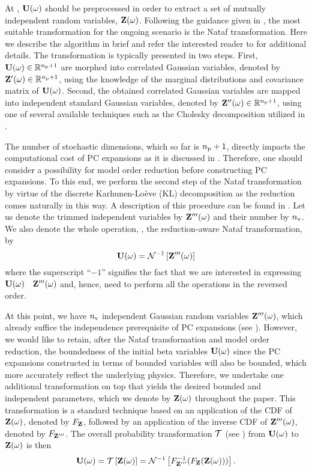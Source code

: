 At , $\mathbf{U}(\omega)$ should be preprocessed in order to extract a set of mutually independent random variables, $\mathbf{Z}(\omega)$.
Following the guidance given in , the most suitable transformation for the ongoing scenario is the Nataf transformation.
Here we describe the algorithm in brief and refer the interested reader to \cite{li2008} for additional details. The transformation is typically presented in two steps.
First, $\mathbf{U}(\omega) \in \mathbb{R}^{{n_\text{p}} + 1}$ are morphed into correlated Gaussian variables, denoted by $\mathbf{Z}'(\omega) \in \mathbb{R}^{{n_\text{p}} + 1}$, using the knowledge of the marginal distributions and covariance matrix of $\mathbf{U}(\omega)$.
Second, the obtained correlated Gaussian variables are mapped into independent standard Gaussian variables, denoted by $\mathbf{Z}''(\omega) \in \mathbb{R}^{{n_\text{p}} + 1}$, using one of several available techniques such as the Cholesky decomposition \cite{press2007} utilized in \cite{li2008}.

The number of stochastic dimensions, which so far is ${n_\text{p}} + 1$, directly impacts the computational cost of PC expansions as it is discussed in .
Therefore, one should consider a possibility for model order reduction before constructing PC expansions.
To this end, we perform the second step of the Nataf transformation by virtue of the discrete Karhunen-Lo\`{e}ve (KL) decomposition \cite{ghanem1991} as the reduction comes naturally in this way.
A description of this procedure can be found in .
Let us denote the trimmed independent variables by $\mathbf{Z}'''(\omega)$ and their number by ${n_\text{v}}$.
We also denote the whole operation, \ie, the reduction-aware Nataf transformation, by
\[
  \mathbf{U}(\omega) = \mathcal{N}^{-1}\left[\mathbf{Z}'''(\omega)\right]
\]
where the superscript ``$-1$'' signifies the fact that we are interested in expressing $\mathbf{U}(\omega)$ \via\ $\mathbf{Z}'''(\omega)$ and, hence, need to perform all the operations in the reversed order.

At this point, we have ${n_\text{v}}$ independent Gaussian random variables $\mathbf{Z}'''(\omega)$, which already suffice the independence prerequisite of PC expansions (see ).
However, we would like to retain, after the Nataf transformation and model order reduction, the boundedness of the initial beta variables $\mathbf{U}(\omega)$ since the PC expansions constructed in terms of bounded variables will also be bounded, which more accurately reflect the underlying physics.
Therefore, we undertake one additional transformation on top that yields the desired bounded and independent parameters, which we denote by $\mathbf{Z}(\omega)$ throughout the paper.
This transformation is a standard technique \cite{durrett2010} based on an application of the CDF of $\mathbf{Z}(\omega)$, denoted by $F_{\mathbf{Z}}$, followed by an application of the inverse CDF of $\mathbf{Z}'''(\omega)$, denoted by $F_{\mathbf{Z}'''}$.
The overall probability transformation $\oTransform$ (see ) from $\mathbf{U}(\omega)$ to $\mathbf{Z}(\omega)$ is then
\[
  \vU(\o) = \oTransform{\vZ(\o)} = \oInvNataf{\fCDF^{-1}_{\vZ'''}(\fCDF_{\vZ}(\vZ(\o)))}.
\]
